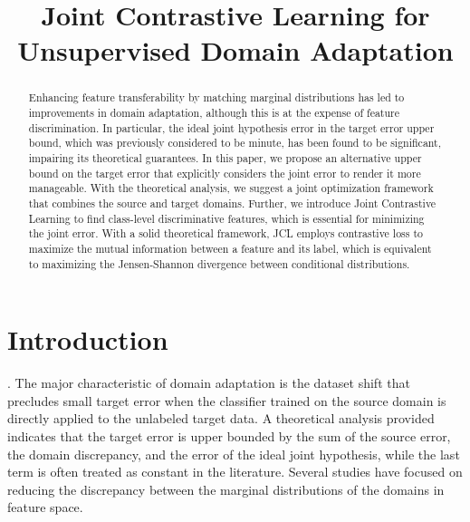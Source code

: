 \documentclass[conference]{IEEEtran}
\begin{document}
\title{Joint Contrastive Learning for Unsupervised Domain Adaptation}

\author{
}

\maketitle

\begin{abstract}
Enhancing feature transferability by matching marginal distributions has led to improvements in domain adaptation, although this is at the expense of feature discrimination.
In particular, the ideal joint hypothesis error in the target error upper bound, which was previously considered to be minute, has been found to be significant, impairing its theoretical guarantees.
In this paper, we propose an alternative upper bound on the target error that explicitly considers the joint error to render it more manageable.
With the theoretical analysis, we suggest a joint optimization framework that combines the source and target domains.
Further, we introduce Joint Contrastive Learning to find class-level discriminative features, which is essential for minimizing the joint error.
With a solid theoretical framework, JCL employs contrastive loss to maximize the mutual information between a feature and its label, which is equivalent to maximizing the Jensen-Shannon divergence between conditional distributions.
\end{abstract}

\section{Introduction}
\cite{b1}. The major characteristic of domain adaptation is the dataset shift that precludes small target error when the classifier trained on the source domain is directly applied to the unlabeled target data.
A theoretical analysis provided indicates that the target error is upper bounded by the sum of the source error, the domain discrepancy, and the error of the ideal joint hypothesis, while the last term is often treated as constant in the literature.
Several studies have focused on reducing the discrepancy between the marginal distributions of the domains in feature space.
\end{document}
